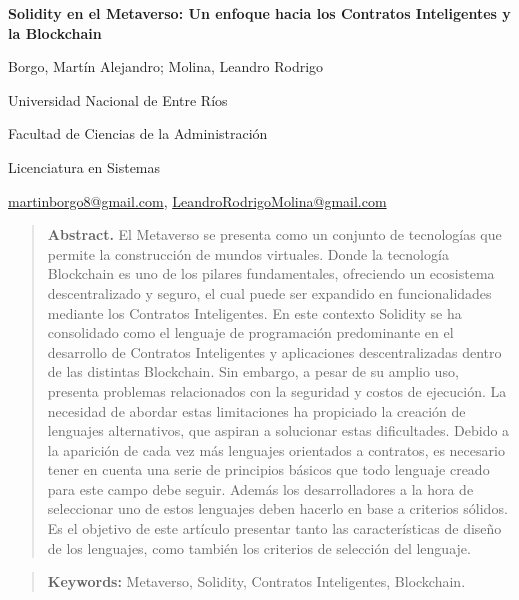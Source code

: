 \documentclass[a4paper,10pt]{article}
\begin{document}
	\centering
	{\fontsize{14}{17}\bfseries Solidity en el Metaverso: Un enfoque hacia los Contratos Inteligentes y la Blockchain\par}
	{\small Borgo, Martín Alejandro; Molina, Leandro Rodrigo\par}
	{\normalsize Universidad Nacional de Entre Ríos\par}
	{\normalsize Facultad de Ciencias de la Administración\par}
	{\normalsize Licenciatura en Sistemas \par}
	{\small \href{mailto:martinborgo8@gmail.com}{martinborgo8@gmail.com}, \href{mailto:LeandroRodrigoMolina@gmail.com}{LeandroRodrigoMolina@gmail.com}\par}	
	{\small \justify \begin{quote}\textbf{Abstract.} El Metaverso se presenta como un conjunto de tecnologías que permite la construcción de mundos virtuales. Donde la tecnología Blockchain es uno de los pilares fundamentales, ofreciendo un ecosistema descentralizado y seguro, el cual puede ser expandido en funcionalidades mediante los Contratos Inteligentes. En este contexto Solidity se ha consolidado como el lenguaje de programación predominante en el desarrollo de Contratos Inteligentes y aplicaciones descentralizadas dentro de las distintas Blockchain. Sin embargo, a pesar de su amplio uso, presenta problemas relacionados con la seguridad y costos de ejecución. La necesidad de abordar estas limitaciones ha propiciado la creación de lenguajes alternativos, que aspiran a solucionar estas dificultades. Debido a la aparición de cada vez más lenguajes orientados a contratos, es necesario tener en cuenta una serie de principios básicos que todo lenguaje creado para este campo debe seguir. Además los desarrolladores a la hora de seleccionar uno de estos lenguajes deben hacerlo en base a criterios sólidos. Es el objetivo de este artículo presentar tanto las características de diseño de los lenguajes, como también los criterios de selección del lenguaje. \end{quote} \par}
	{\small \justify \begin{quote} \textbf{Keywords:} Metaverso, Solidity, Contratos Inteligentes, Blockchain. \end{quote} \par}
	\justifying %
\end{document}
